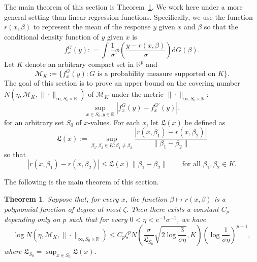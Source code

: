 \documentclass[11pt]{article}
\numberwithin{equation}{section}
\newtheorem{theorem}{Theorem}[section]
\newcommand{\RS}{\mathbb{R}}
\def\qt#1{\qquad\text{#1}}
\newcommand{\lipsz}{\mathfrak{L}}
\begin{document}
\begin{appendices}
The main theorem of this section is Theorem~\ref{theorem:metric_entropy}. We work here under a more general  setting than linear regression functions. Specifically, we use the function $r(x,\beta)$ to represent the mean of the response $y$ given $x$ and $\beta$ so that the conditional density function of $y$ given $x$ is
\[
f^G_x(y) : = \int \frac{1}{\sigma}\phi\left(\frac{y - r(x,\beta)}{\sigma}\right) \mathrm{d} G(\beta).
\]
Let $K$ denote an arbitrary compact set in $\RS^p$ and 
\begin{equation}
\mathcal{M}_K:= \{ f^G_x(y) : G \text{ is a probability measure supported on } K \}. 
\label{eq:Mkset}
\end{equation}
The goal of this section is to prove an upper bound on the covering number $N(\eta, \mathcal{M}_K, \| \cdot \|_{\infty, S_0 \times \RS})$ of $\mathcal{M}_K$ under the metric $\| \cdot \|_{\infty, S_0 \times \RS}$:
\begin{equation*}
  \sup_{x \in S_0, y \in \RS} \left|f_x^G(y) - f_x^{G'}(y)  \right|.
\end{equation*}
for an arbitrary set $S_0$ of $x$-values. For each $x$, let $ \lipsz(x)$ be defined as
\begin{equation}
  \lipsz(x) := \sup_{\beta_1, \beta_2 \in K : \beta_1 \neq \beta_2} \frac{\left|r(x, \beta_1) - r(x, \beta_2) \right|}{\|\beta_1 - \beta_2\|} 
  \label{eq:lipsz_defn_appendix}
\end{equation}
so that
\begin{equation*}
|r(x,\beta_1) - r(x,\beta_2) | \leq \lipsz(x) \| \beta_1- \beta_2 \| \qt{for all $\beta_1, \beta_2 \in K$}.
\end{equation*}

The following is the main theorem of this section. 
\begin{theorem}\label{theorem:metric_entropy}
  Suppose that, for every $x$, the function $\beta \mapsto r(x, \beta)$ is a polynomial function of degree at most $\zeta$. Then there exists a constant $C_p$ depending only on $p$ such that for every $0 < \eta < e^{-1}\sigma^{-1}$,  we have
\begin{equation}\label{eq:metric_entropy}
\log N(\eta, \mathcal{M}_K, \| \cdot \|_{\infty,S_0\times \RS}) \leq C_p \zeta^p N \left(\frac{\sigma}{\lipsz_{S_0}} \sqrt{2\log \frac{3}{\sigma \eta}}, K \right) \left(\log \frac{1}{\sigma \eta} \right)^{p+1},
\end{equation}
where $\lipsz_{S_0} = \sup_{x\in S_0} \lipsz(x)$.
\end{theorem}


\end{appendices}
\end{document}
